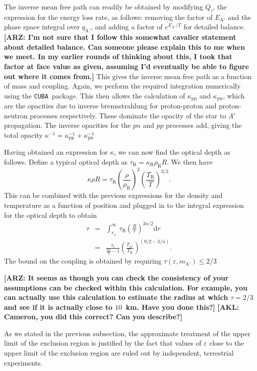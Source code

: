 \documentclass[nofootinbib,prd,superscriptaddress,twocolumn]{revtex4}
\newcommand{\beq}{\begin{equation}}
\newcommand{\eeq}{\end{equation}}
\newcommand{\bea}{\begin{eqnarray}}
\newcommand{\eea}{\end{eqnarray}}
\newcommand{\qa}{q_{\mathrm{A}'}}
\newcommand{\dd}{\mathrm{d}}
\newcommand{\arz}[1]{{{\bf{\color{BrickRed}[ARZ: #1]}}}}
\newcommand{\akl}[1]{{{\bf{\color{Blue}[AKL: #1]}}}}
\begin{document}
The inverse mean free path can readily be obtained by modifying $ Q_i $, 
the expression for the energy loss rate, as follows: removing the factor of $ E_\mathrm{A'} $ 
and the phase space integral over $ \qa $, and adding a factor of $ e^{E_\mathrm{A'}/T} $ for detailed balance. 
\arz{I'm not sure that I follow this somewhat cavalier statement about detailed balance. Can someone 
please explain this to me when we meet. In my earlier rounds of thinking about this, I took that factor 
at face value as given, assuming I'd eventually be able to figure out where it comes from.} 
This gives the inverse mean free path as a function of mass and coupling. 
Again, we perform the required integration numerically using the {\tt CUBA }package. 
This then allows the calculation of $\kappa_{\mathrm{pp}}$ and $\kappa_{\mathrm{pn}}$, 
which are the opacities due to inverse bremsstrahlung for proton-proton and proton-neutron 
processes respectively. These dominate the opacity of the star to $A'$ propagation. 
The inverse opacities for the $pn$ and $pp$ processes add, 
giving the total opacity $ \kappa^{-1} = \kappa_{\mathrm{pp}}^{-1} + \kappa_{\mathrm{pn}}^{-1} $


Having obtained an expression for $ \kappa $, we can now find the optical depth as follows. 
Define a typical optical depth as $\tau_\mathrm{R} = \kappa_\mathrm{R} \rho_\mathrm{R} R $. We then have 
\beq 
\kappa \rho R = \tau_\mathrm{R} \left( \frac{\rho}{\rho_\mathrm{R}} \right)^2 \left( \frac{T_\mathrm{R}}{T} \right)^{3/2}.
\eeq
%
This can be combined with the previous expressions for the density and temperature as a function of position 
and plugged in to the integral expression for the optical depth to obtain 
\bea 
\tau &=& \int_{r_x}^{\infty}\, \tau_\mathrm{R} \left( \frac{R}{r} \right)^{3n/2} \dd r \\
 &=& \frac{\tau_\mathrm{r}}{\frac{3n}{2}-1} \left( \frac{T_\mathrm{A'}}{T_\mathrm{R}} \right)^{(9/2-3/n)}. 
 \eea
 The bound on the coupling is obtained by requiring  $ \tau(\varepsilon,m_\mathrm{A'}) \le 2/3 $
 
 \arz{It seems as though you can check the consistency of your assumptions can 
 be checked within this calculation. For example, you can actually use this calculation 
 to estimate the radius at which $\tau=2/3$ and see if it is actually close to 
 $10$~km. Have you done this?} %
\akl{Cameron, you did this correct?  Can you describe?}

As we stated in the previous subsection, the approximate treatment of the upper limit of the exclusion region 
is justified by the fact that values of $\varepsilon$ close to the upper limit of the exclusion region are 
ruled out by independent, terrestrial experiments.
\end{document}
